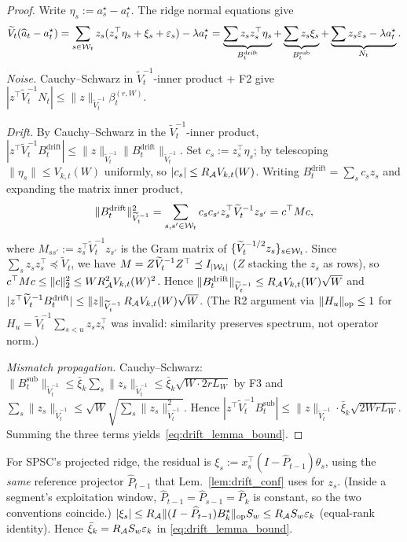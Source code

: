 \begin{proof}
Write $\eta_s:=a_s^\star-a_t^\star$. The ridge normal equations give
\[
\widetilde V_t(\widehat a_t-a_t^\star)
=\sum_{s\in\mathcal{W}_t}z_s(z_s^\top\eta_s+\xi_s+\varepsilon_s)-\lambda a_t^\star
=\underbrace{\sum z_sz_s^\top\eta_s}_{B_t^{\mathrm{drift}}}
+\underbrace{\sum z_s\xi_s}_{B_t^{\mathrm{sub}}}
+\underbrace{\sum z_s\varepsilon_s-\lambda a_t^\star}_{N_t}.
\]
\emph{Noise.} Cauchy--Schwarz in $\widetilde V_t^{-1}$-inner product +
F2 give $|z^\top\widetilde V_t^{-1}N_t|\le\|z\|_{\widetilde V_t^{-1}}\beta_t^{(r,W)}$.

\emph{Drift.} By Cauchy--Schwarz in the $\widetilde V_t^{-1}$-inner
product, $|z^\top\widetilde V_t^{-1}B_t^{\mathrm{drift}}|
\le\|z\|_{\widetilde V_t^{-1}}\|B_t^{\mathrm{drift}}\|_{\widetilde V_t^{-1}}$.
Set $c_s := z_s^\top\eta_s$; by telescoping $\|\eta_s\|\le V_{k,t}(W)$
uniformly, so $|c_s|\le R_{\mathcal{A}} V_{k,t}(W)$. Writing
$B_t^{\mathrm{drift}}=\sum_s c_s z_s$ and expanding the matrix inner product,
\[
\|B_t^{\mathrm{drift}}\|^2_{\widetilde V_t^{-1}}
= \sum_{s,s'\in\mathcal{W}_t} c_s c_{s'} z_s^\top\widetilde V_t^{-1}z_{s'}
= c^\top M c,
\]
where $M_{ss'}:=z_s^\top\widetilde V_t^{-1}z_{s'}$ is the Gram matrix of
$\{\widetilde V_t^{-1/2}z_s\}_{s\in\mathcal{W}_t}$. Since
$\sum_s z_sz_s^\top\preceq\widetilde V_t$, we have
$M = Z\widetilde V_t^{-1}Z^\top \preceq I_{|\mathcal{W}_t|}$ ($Z$ stacking the
$z_s$ as rows), so $c^\top M c\le\|c\|_2^2\le W R_{\mathcal{A}}^2 V_{k,t}(W)^2$.
Hence $\|B_t^{\mathrm{drift}}\|_{\widetilde V_t^{-1}}\le R_{\mathcal{A}} V_{k,t}(W)\sqrt W$
and $|z^\top\widetilde V_t^{-1}B_t^{\mathrm{drift}}|\le\|z\|_{\widetilde V_t^{-1}}\,R_{\mathcal{A}} V_{k,t}(W)\sqrt W$.
(The R2 argument via $\|H_u\|_{\mathrm{op}}\le 1$ for $H_u=\widetilde V_t^{-1}\sum_{s<u}z_sz_s^\top$
was invalid: similarity preserves spectrum, not operator norm.)

\emph{Mismatch propagation.} Cauchy--Schwarz:
$\|B_t^{\mathrm{sub}}\|_{\widetilde V_t^{-1}}\le\bar\xi_k\sum_s\|z_s\|_{\widetilde V_t^{-1}}
\le\bar\xi_k\sqrt{W\cdot 2rL_W}$ by F3 and $\sum_s\|z_s\|_{\widetilde V_t^{-1}}\le\sqrt W\sqrt{\sum_s\|z_s\|_{\widetilde V_t^{-1}}^2}$.
Hence $|z^\top\widetilde V_t^{-1}B_t^{\mathrm{sub}}|\le\|z\|_{\widetilde V_t^{-1}}\cdot\bar\xi_k\sqrt{2WrL_W}$.
Summing the three terms yields~\eqref{eq:drift_lemma_bound}.
\end{proof}

\begin{remark}
\label{rem:drift_lemma_spec}
For SPSC's projected ridge, the residual is
$\xi_s:=x_s^\top(I-\widehat P_{t-1})\theta_s$, using the \emph{same}
reference projector $\widehat P_{t-1}$ that Lem.~\ref{lem:drift_conf}
uses for $z_s$. (Inside a segment's exploitation window,
$\widehat P_{t-1}=\widehat P_{s-1}=\widehat P_k$ is constant, so the
two conventions coincide.)
$|\xi_s|\le R_{\mathcal{A}}\|(I-\widehat P_{t-1})B_k^\star\|_{\mathrm{op}} S_w\le R_{\mathcal{A}} S_w\varepsilon_k$
(equal-rank identity). Hence $\bar\xi_k=R_{\mathcal{A}} S_w\varepsilon_k$ in
\eqref{eq:drift_lemma_bound}.
\end{remark}

